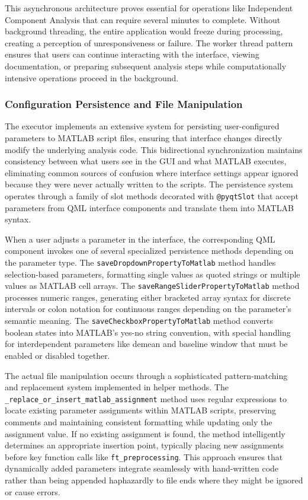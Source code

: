 \documentclass[12pt]{report}
\begin{document}
This asynchronous architecture proves essential for operations like Independent Component Analysis that can require several minutes to complete. Without background threading, the entire application would freeze during processing, creating a perception of unresponsiveness or failure. The worker thread pattern ensures that users can continue interacting with the interface, viewing documentation, or preparing subsequent analysis steps while computationally intensive operations proceed in the background.

\subsubsection{Configuration Persistence and File Manipulation}

The executor implements an extensive system for persisting user-configured parameters to MATLAB script files, ensuring that interface changes directly modify the underlying analysis code. This bidirectional synchronization maintains consistency between what users see in the GUI and what MATLAB executes, eliminating common sources of confusion where interface settings appear ignored because they were never actually written to the scripts. The persistence system operates through a family of slot methods decorated with \verb|@pyqtSlot| that accept parameters from QML interface components and translate them into MATLAB syntax.

When a user adjusts a parameter in the interface, the corresponding QML component invokes one of several specialized persistence methods depending on the parameter type. The \verb|saveDropdownPropertyToMatlab| method handles selection-based parameters, formatting single values as quoted strings or multiple values as MATLAB cell arrays. The \verb|saveRangeSliderPropertyToMatlab| method processes numeric ranges, generating either bracketed array syntax for discrete intervals or colon notation for continuous ranges depending on the parameter's semantic meaning. The \verb|saveCheckboxPropertyToMatlab| method converts boolean states into MATLAB's yes-no string convention, with special handling for interdependent parameters like demean and baseline window that must be enabled or disabled together.

The actual file manipulation occurs through a sophisticated pattern-matching and replacement system implemented in helper methods. The \verb|_replace_or_insert_matlab_assignment| method uses regular expressions to locate existing parameter assignments within MATLAB scripts, preserving comments and maintaining consistent formatting while updating only the assignment value. If no existing assignment is found, the method intelligently determines an appropriate insertion point, typically placing new assignments before key function calls like \verb|ft_preprocessing|. This approach ensures that dynamically added parameters integrate seamlessly with hand-written code rather than being appended haphazardly to file ends where they might be ignored or cause errors.
\end{document}
